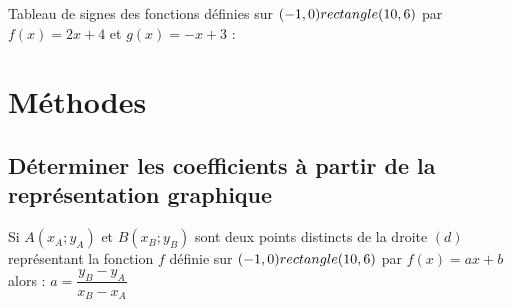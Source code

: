 \vspace{0.5cm}
\begin{Exemple}
Tableau de signes des fonctions définies sur $(-1,0) rectangle (10,6)$ par $f(x)=2x+4$ et $g(x)=-x+3$ :\\

\begin{minipage}[c]{0.4\linewidth}
\end{minipage} \hfill
\begin{minipage}[c]{0.5\linewidth}
\end{minipage}

\end{Exemple}   

\newpage
\section{Méthodes}

\subsection{Déterminer les coefficients à partir de la représentation graphique}

\begin{Propriété}
Si $A(x_A ; y_A)$ et $ B(x_B ; y_B)$ sont deux points distincts de la droite $(d)$ représentant la
fonction $f$ définie sur $(-1,0) rectangle (10,6)$ par $f(x)=ax+b$ alors : $a=\dfrac{y_B-y_A}{x_B-x_A}$
\end{Propriété}





